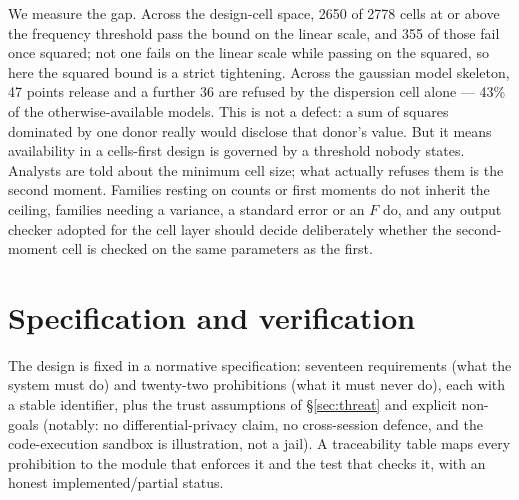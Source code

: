 \documentclass[11pt,a4paper]{article}
\begin{document}
We measure the gap. Across the design-cell space, 2650 of 2778 cells at or above
the frequency threshold pass the bound on the linear scale, and 355 of those
fail once squared; not one fails on the linear scale while passing on the
squared, so here the squared bound is a strict tightening. Across the gaussian
model skeleton, 47 points release and a further 36 are refused by the dispersion
cell alone --- 43\% of the otherwise-available models. This is not a defect: a
sum of squares dominated by one donor really would disclose that donor's value.
But it means availability in a cells-first design is governed by a threshold
nobody states. Analysts are told about the minimum cell size; what actually
refuses them is the second moment. Families resting on counts or first moments
do not inherit the ceiling, families needing a variance, a standard error or an
$F$ do, and any output checker adopted for the cell layer should decide
deliberately whether the second-moment cell is checked on the same parameters as
the first.

\section{Specification and verification}
\label{sec:spec}

The design is fixed in a normative specification: seventeen requirements (what
the system must do) and twenty-two prohibitions (what it must never do), each
with a stable identifier, plus the trust assumptions of \S\ref{sec:threat} and
explicit non-goals (notably: no differential-privacy claim, no cross-session
defence, and the code-execution sandbox is illustration, not a jail). A
traceability table maps every prohibition to the module that enforces it and the
test that checks it, with an honest implemented/partial status.
\end{document}
